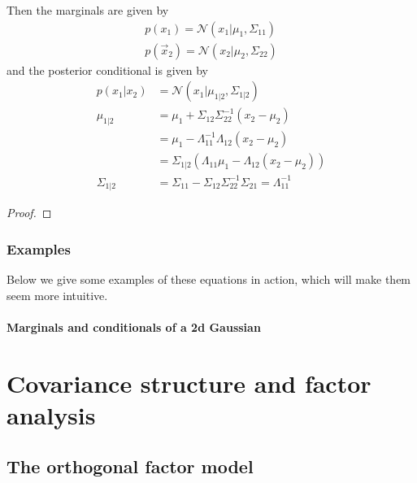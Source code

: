 \begin{refsection}
\begin{theorem}
	Then the marginals are given by
	\begin{equation}
	\begin{split}
	p(x_1)= \mathcal{N}(x_1|\mu_1,\Sigma_{11})\\
	p(\vec{x}_2)= \mathcal{N}(x_2|\mu_2,\Sigma_{22})
	\end{split}
	\end{equation}
	and the posterior conditional is given by
	\begin{equation}\label{eqn:Marginals-and-conditionals-of-an-MVN}
	\boxed{\begin{split}
		p(x_1|x_2)& =\mathcal{N}(x_1|\mu_{1|2},\Sigma_{1|2}) \\
		\mu_{1|2}& = \mu_1+\Sigma_{12}\Sigma_{22}^{-1}(x_2-\mu_2) \\
		& = \mu_1-\Lambda_{11}^{-1}\Lambda_{12}(x_2-\mu_2) \\
		& = \Sigma_{1|2}(\Lambda_{11}\mu_1-\Lambda_{12}(x_2-\mu_2)) \\
		\Sigma_{1|2}& = \Sigma_{11}-\Sigma_{12}\Sigma_{22}^{-1}\Sigma_{21}=\Lambda_{11}^{-1}
		\end{split}}
	\end{equation}
\end{theorem}
\begin{proof}
	
\end{proof}

\subsubsection{Examples}
Below we give some examples of these equations in action, which will make them seem more intuitive.


\paragraph{Marginals and conditionals of a 2d Gaussian}



\section{Covariance structure and factor analysis}\label{ch:statistical-models:sec:FactorAnalysis}
\subsection{The orthogonal factor model}

\end{refsection}
